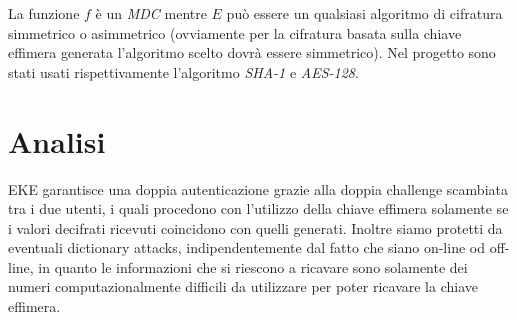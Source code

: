 \documentclass[10pt, letterpaper]{article}
\begin{document}
La funzione $f$ è un \textit{MDC} mentre $E$ può essere un qualsiasi algoritmo
di cifratura simmetrico o asimmetrico (ovviamente per la cifratura basata sulla
chiave effimera generata l'algoritmo scelto dovrà essere simmetrico).
Nel progetto sono stati usati rispettivamente l'algoritmo \textit{SHA-1} e
\textit{AES-128}.

\section{Analisi}
EKE garantisce una doppia autenticazione grazie alla doppia challenge scambiata
tra i due utenti, i quali procedono con l'utilizzo della chiave effimera
solamente se i valori decifrati ricevuti coincidono con quelli generati.
Inoltre siamo protetti da eventuali dictionary attacks, indipendentemente dal
fatto che siano on-line od off-line, in quanto le informazioni che si riescono a
ricavare sono solamente dei numeri computazionalmente difficili da utilizzare
per poter ricavare la chiave effimera.
\end{document}
